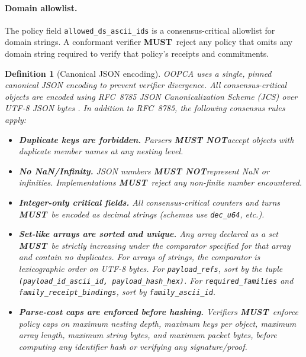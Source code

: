 \documentclass[11pt]{article}
\newcommand{\MUST}{\textbf{MUST}}
\newcommand{\MUSTNOT}{\textbf{MUST NOT}}
\newtheorem{definition}{Definition}
\begin{document}
\paragraph{Domain allowlist.}
The policy field \texttt{allowed\_ds\_ascii\_ids} is a consensus-critical allowlist for domain strings.
A conformant verifier \MUST\ reject any policy that omits any domain string required to verify that policy's receipts and commitments.



\begin{definition}[Canonical JSON encoding]\label{def:jcs}
OOPCA uses a single, pinned canonical JSON encoding to prevent verifier divergence.
All consensus-critical objects are encoded using RFC~8785 JSON Canonicalization Scheme (JCS) over UTF-8 JSON bytes \cite{RFC8785}.
In addition to RFC~8785, the following consensus rules apply:
\begin{itemize}[leftmargin=1.2em]
\item \textbf{Duplicate keys are forbidden.} Parsers \MUSTNOT accept objects with duplicate member names at any nesting level.
\item \textbf{No NaN/Infinity.} JSON numbers \MUSTNOT represent NaN or infinities. Implementations \MUST\ reject any non-finite number encountered.
\item \textbf{Integer-only critical fields.} All consensus-critical counters and turns \MUST\ be encoded as decimal strings (schemas use \texttt{dec\_u64}, etc.).
\item \textbf{Set-like arrays are sorted and unique.} Any array declared as a set \MUST\ be strictly increasing under the comparator specified for that array and contain no duplicates. For arrays of strings, the comparator is lexicographic order on UTF-8 bytes. For \texttt{payload\_refs}, sort by the tuple \texttt{(payload\_id\_ascii\_id, payload\_hash\_hex)}. For \texttt{required\_families} and \texttt{family\_receipt\_bindings}, sort by \texttt{family\_ascii\_id}.
\item \textbf{Parse-cost caps are enforced before hashing.} Verifiers \MUST\ enforce policy caps on maximum nesting depth, maximum keys per object, maximum array length, maximum string bytes, and maximum packet bytes, \emph{before} computing any identifier hash or verifying any signature/proof.
\end{itemize}
\end{definition}
\end{document}
